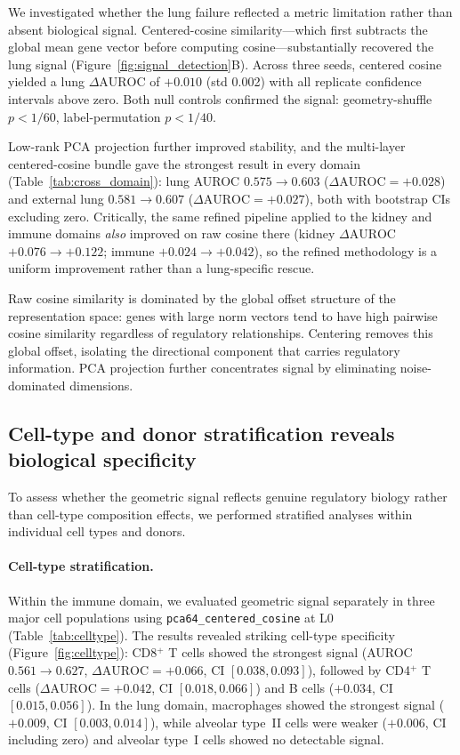 \documentclass[11pt]{article}
\newcommand{\DAURC}{\Delta\mathrm{AUROC}}
\begin{document}
We investigated whether the lung failure reflected a metric limitation rather than absent biological signal.
Centered-cosine similarity---which first subtracts the global mean gene vector before computing cosine---substantially recovered the lung signal (Figure~\ref{fig:signal_detection}B).
Across three seeds, centered cosine yielded a lung $\DAURC$ of $+0.010$ (std 0.002) with all replicate confidence intervals above zero.
Both null controls confirmed the signal: geometry-shuffle $p < 1/60$, label-permutation $p < 1/40$.

Low-rank PCA projection further improved stability, and the multi-layer centered-cosine bundle gave the strongest result in every domain (Table~\ref{tab:cross_domain}): lung AUROC $0.575 \to 0.603$ ($\DAURC = +0.028$) and external lung $0.581 \to 0.607$ ($\DAURC = +0.027$), both with bootstrap CIs excluding zero.
Critically, the same refined pipeline applied to the kidney and immune domains \emph{also} improved on raw cosine there (kidney $\DAURC$ $+0.076 \to +0.122$; immune $+0.024 \to +0.042$), so the refined methodology is a uniform improvement rather than a lung-specific rescue.

Raw cosine similarity is dominated by the global offset structure of the representation space: genes with large norm vectors tend to have high pairwise cosine similarity regardless of regulatory relationships.
Centering removes this global offset, isolating the directional component that carries regulatory information.
PCA projection further concentrates signal by eliminating noise-dominated dimensions.

\subsection*{Cell-type and donor stratification reveals biological specificity}

To assess whether the geometric signal reflects genuine regulatory biology rather than cell-type composition effects, we performed stratified analyses within individual cell types and donors.

\paragraph{Cell-type stratification.}
Within the immune domain, we evaluated geometric signal separately in three major cell populations using \texttt{pca64\_centered\_cosine} at L0 (Table~\ref{tab:celltype}).
The results revealed striking cell-type specificity (Figure~\ref{fig:celltype}): CD8$^+$ T cells showed the strongest signal (AUROC $0.561 \to 0.627$, $\DAURC = +0.066$, CI $[0.038, 0.093]$), followed by CD4$^+$ T cells ($\DAURC = +0.042$, CI $[0.018, 0.066]$) and B cells ($+0.034$, CI $[0.015, 0.056]$).
In the lung domain, macrophages showed the strongest signal ($+0.009$, CI $[0.003, 0.014]$), while alveolar type~II cells were weaker ($+0.006$, CI including zero) and alveolar type~I cells showed no detectable signal.
\end{document}
